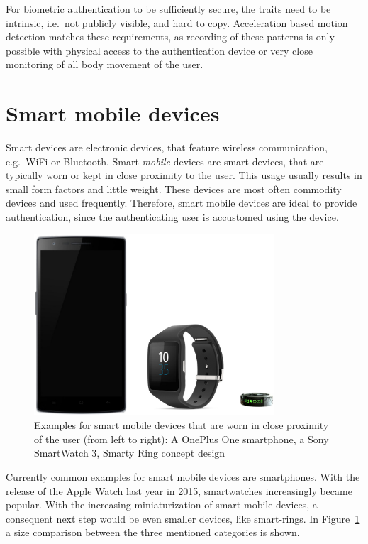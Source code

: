 For biometric authentication to be sufficiently secure, the traits need to be intrinsic, i.e.\ not publicly visible, and hard to copy. Acceleration based motion detection matches these requirements, as recording of these patterns is only possible with physical access to the authentication device or very close monitoring of all body movement of the user.

\section{Smart mobile devices}
Smart devices are electronic devices, that feature wireless communication, e.g.\ WiFi or Bluetooth. Smart \emph{mobile} devices are smart devices, that are typically worn or kept in close proximity to the user. This usage usually results in small form factors and little weight. These devices are most often commodity devices and used frequently. Therefore, smart mobile devices are ideal to provide authentication, since the authenticating user is accustomed using the device.

\begin{figure}
    \centering
    \includegraphics[width=0.8\textwidth]{figures/SmartDevices.png}
    \caption{Examples for smart mobile devices that are worn in close proximity of the user (from left to right): A OnePlus One smartphone, a Sony SmartWatch 3, Smarty Ring concept design}
    \label{fig:smartdevices}
\end{figure}
Currently common examples for smart mobile devices are smartphones. With the release of the Apple Watch last year in 2015, smartwatches increasingly became popular. With the increasing miniaturization of smart mobile devices, a consequent next step would be even smaller devices, like smart-rings. In Figure~\ref{fig:smartdevices} a size comparison between the three mentioned categories is shown.

